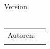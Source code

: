 \begin{titlepage}
\begin{center}
    \vspace{20mm}
        \normalsize{Version} \\
        \vspace{1mm}
        \normalsize{\TAGvnumber{}} \\
    \vspace{20mm}

    \fontsize{9pt}{11pt}\selectfont

    \begin{tabular}{rl}
      Autoren: & \small{\TAGauthorA{}}\\
               & \small{\TAGauthorB{}}\\
    \end{tabular}
\end{center}
\end{titlepage}
%
%
 %
